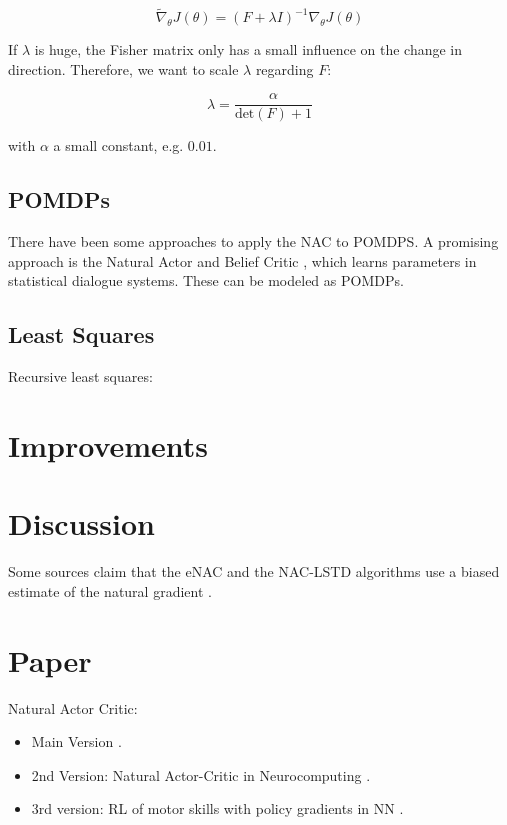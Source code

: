 	\begin{equation}
		\widetilde{\nabla}_{\theta} J(\theta) = \left( F + \lambda I \right)^{-1} \nabla_\theta J(\theta)
	\end{equation}
	
	\noindent If $\lambda$ is huge, the Fisher matrix only has a small influence on the change in direction. Therefore, we want to scale $\lambda$ regarding $F$:
	
	\begin{equation}
		\lambda = \dfrac{\alpha}{\text{det}(F) + 1}
	\end{equation}

	\noindent with $\alpha$ a small constant, e.g. $0.01$.
	
	
	\subsection{POMDPs}
	There have been some approaches to apply the NAC to POMDPS. A promising approach is the Natural Actor and Belief Critic \cite{jurvcivcek2011natural}, which learns parameters in statistical dialogue systems. These can be modeled as POMDPs.
	
	\subsection{Least Squares}
	
	Recursive least squares: \cite{park2005rls}

\newpage
\section{Improvements}

\newpage
\section{Discussion}

Some sources claim that the eNAC and the NAC-LSTD algorithms use a biased estimate of the natural gradient \cite{thomas2014bias}.


\newpage
\section{Paper}
Natural Actor Critic:
\begin{itemize}
	\item Main Version \cite{peters2005natural}.
	\item 2nd Version: Natural Actor-Critic in Neurocomputing \cite{peters2008natural}.
	\item 3rd version: RL of motor skills with policy gradients in NN \cite{peters2008reinforcement}.
\end{itemize}

